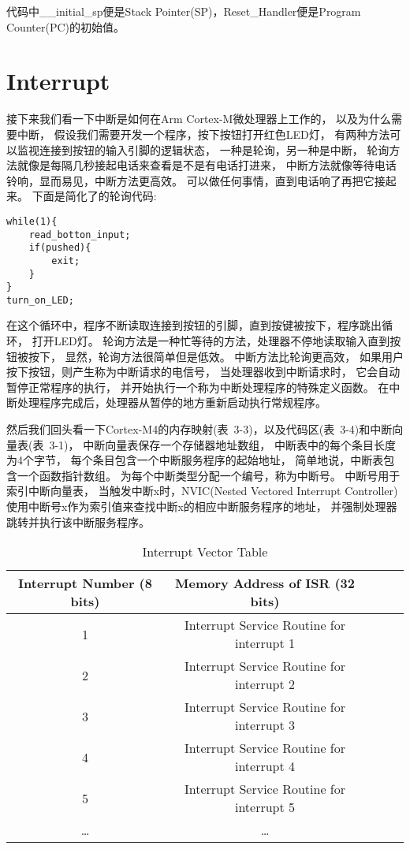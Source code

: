 代码中\_\_initial\_sp便是Stack Pointer(SP)，Reset\_Handler便是Program Counter(PC)的初始值。


\section{Interrupt}
接下来我们看一下中断是如何在Arm Cortex-M微处理器上工作的，
以及为什么需要中断，
假设我们需要开发一个程序，按下按钮打开红色LED灯，
有两种方法可以监视连接到按钮的输入引脚的逻辑状态，
一种是轮询，另一种是中断，
轮询方法就像是每隔几秒接起电话来查看是不是有电话打进来，
中断方法就像等待电话铃响，显而易见，中断方法更高效。
可以做任何事情，直到电话响了再把它接起来。
下面是简化了的轮询代码:

\begin{lstlisting}[language={[ANSI]C},keywordstyle=\color{blue!70},commentstyle=\color{red!50!green!50!blue!50},frame=shadowbox, rulesepcolor=\color{red!20!green!20!blue!20}]
while(1){
    read_botton_input;
    if(pushed){
        exit;
    }
}
turn_on_LED;
\end{lstlisting}

在这个循环中，程序不断读取连接到按钮的引脚，直到按键被按下，程序跳出循环，
打开LED灯。
轮询方法是一种忙等待的方法，处理器不停地读取输入直到按钮被按下，
显然，轮询方法很简单但是低效。
中断方法比轮询更高效，
如果用户按下按钮，则产生称为中断请求的电信号，
当处理器收到中断请求时，
它会自动暂停正常程序的执行，
并开始执行一个称为中断处理程序的特殊定义函数。
在中断处理程序完成后，处理器从暂停的地方重新启动执行常规程序。

然后我们回头看一下Cortex-M4的内存映射(表~3-3)，以及代码区(表~3-4)和中断向量表(表~3-1)，
中断向量表保存一个存储器地址数组，
中断表中的每个条目长度为4个字节，
每个条目包含一个中断服务程序的起始地址，
简单地说，中断表包含一个函数指针数组。
为每个中断类型分配一个编号，称为中断号。 
中断号用于索引中断向量表，
当触发中断x时，NVIC(Nested Vectored Interrupt Controller)使用中断号x作为索引值来查找中断x的相应中断服务程序的地址，
并强制处理器跳转并执行该中断服务程序。
\begin{table}[htbp]
    \caption{  Interrupt Vector Table }\label{tab:table1}
    \vspace{0.5em}\centering\wuhao
    \begin{tabular}{ccccc}
    \toprule[1.5pt]
    Interrupt Number (8 bits) & Memory Address of ISR (32 bits) \\
    \midrule[1pt]
    1    &      Interrupt Service Routine for interrupt 1 \\
    2    &      Interrupt Service Routine for interrupt 2 \\
    3    &      Interrupt Service Routine for interrupt 3 \\
    4    &      Interrupt Service Routine for interrupt 4 \\
    5    &      Interrupt Service Routine for interrupt 5 \\
    \dots &     \dots \\
  
    \bottomrule[1.5pt]
    \end{tabular}
    \vspace{\baselineskip}
    \end{table}


